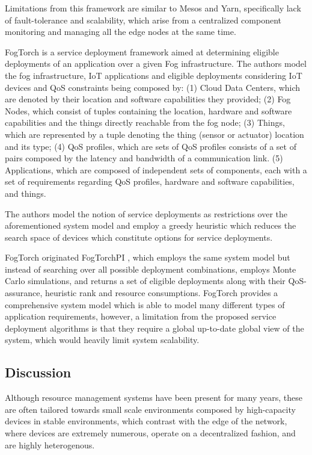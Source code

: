 Limitations from this framework are similar to Mesos and Yarn, specifically lack of fault-tolerance and scalability, which arise from a centralized component monitoring and managing all the edge nodes at the same time. 

FogTorch \cite{Brogi2017} is a service deployment framework aimed at determining eligible  deployments of an application over a given Fog infrastructure. The authors model the fog infrastructure, IoT applications and eligible deployments considering IoT devices and QoS constraints being composed by: (1) Cloud Data Centers, which are denoted by their location and software capabilities they provided; (2) Fog Nodes, which consist of tuples containing the location, hardware and software capabilities and the things directly reachable from the fog node; (3) Things, which are represented by a tuple denoting the thing (sensor or actuator) location and its type; (4) QoS profiles, which are sets of QoS profiles consists of a set of pairs composed by the latency and bandwidth of a communication link. (5) Applications, which are composed of independent sets of components, each with a set of requirements regarding QoS profiles, hardware and software capabilities, and things.

The authors model the notion of service deployments as restrictions over the aforementioned system model and employ a greedy heuristic which reduces the search space of devices which constitute options for service deployments.

FogTorch originated FogTorchPI \cite{brogi2017best}, which employs the same system model but instead of searching over all possible deployment combinations, employs Monte Carlo simulations, and returns a set of eligible deployments along with their QoS-assurance, heuristic rank and resource consumptions. FogTorch provides a comprehensive system model which is able to model many different types of application requirements, however, a limitation from the proposed service deployment algorithms is that they require a global up-to-date global view of the system, which would heavily limit system scalability.

\subsection{Discussion}

Although resource management systems have been present for many years, these are often tailored towards small scale environments composed by high-capacity devices in stable environments, which contrast with the edge of the network, where devices are extremely numerous, operate on a decentralized fashion, and are highly heterogenous.

